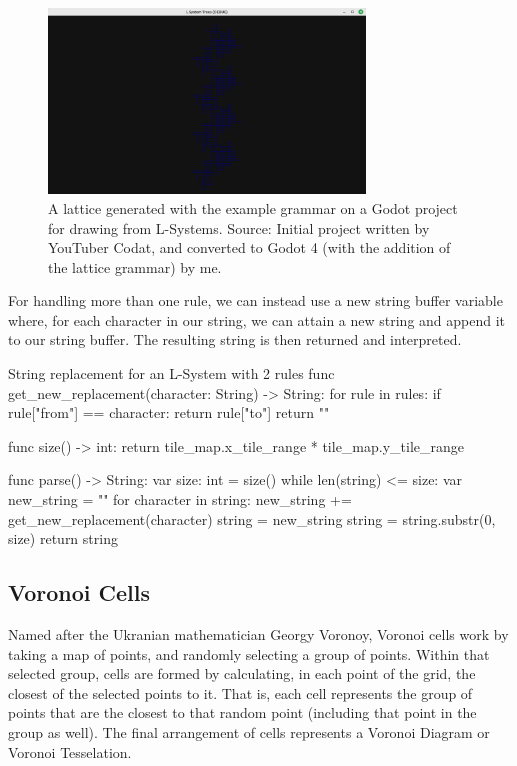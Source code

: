 \begin{figure}[H]
    \centering
    \includegraphics[width=0.75\textwidth]{Images/gd4lattice.png}
    \caption{A lattice generated with the example grammar on a Godot project for drawing from L-Systems. Source: Initial project written by YouTuber Codat\cite{codatGD3LSystemYT}\cite{codatGD3LSystemGH}, and converted to Godot 4 (with the addition of the lattice grammar) by me.\cite{codatGD4LSystemGH}}
    \label{fig:lattice2}
\end{figure}

For handling more than one rule, we can instead use a new string buffer variable where, for each character in our string, we can attain a new string and append it to our string buffer. The resulting string is then returned and interpreted.

\begin{codeblock}{String replacement for an L-System with 2 rules}
func get_new_replacement(character: String) -> String:
    for rule in rules:
        if rule["from"] == character:
            return rule["to"]
    return ""

func size() -> int:
    return tile_map.x_tile_range * tile_map.y_tile_range

func parse() -> String:
    var size: int = size()
    while len(string) <= size:
        var new_string = ""
        for character in string:
            new_string += get_new_replacement(character)
        string = new_string
    string = string.substr(0, size)
    return string
\end{codeblock}

\subsection{Voronoi Cells}

Named after the Ukranian mathematician Georgy Voronoy, Voronoi cells work by taking a map of points, and randomly selecting a group of points. Within that selected group, cells are formed by calculating, in each point of the grid, the closest of the selected points to it. That is, each cell represents the group of points that are the closest to that random point (including that point in the group as well). The final arrangement of cells represents a Voronoi Diagram or Voronoi Tesselation.

